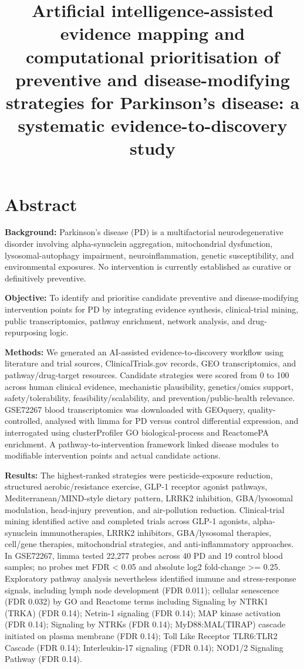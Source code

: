 \documentclass{article}
\begin{document}
\title{Artificial intelligence-assisted evidence mapping and computational prioritisation of preventive and disease-modifying strategies for Parkinson's disease: a systematic evidence-to-discovery study}
\maketitle

\section{Abstract}

\textbf{Background:} Parkinson's disease (PD) is a multifactorial neurodegenerative disorder involving alpha-synuclein aggregation, mitochondrial dysfunction, lysosomal-autophagy impairment, neuroinflammation, genetic susceptibility, and environmental exposures. No intervention is currently established as curative or definitively preventive.


\textbf{Objective:} To identify and prioritise candidate preventive and disease-modifying intervention points for PD by integrating evidence synthesis, clinical-trial mining, public transcriptomics, pathway enrichment, network analysis, and drug-repurposing logic.


\textbf{Methods:} We generated an AI-assisted evidence-to-discovery workflow using literature and trial sources, ClinicalTrials.gov records, GEO transcriptomics, and pathway/drug-target resources. Candidate strategies were scored from 0 to 100 across human clinical evidence, mechanistic plausibility, genetics/omics support, safety/tolerability, feasibility/scalability, and prevention/public-health relevance. GSE72267 blood transcriptomics was downloaded with GEOquery, quality-controlled, analysed with limma for PD versus control differential expression, and interrogated using clusterProfiler GO biological-process and ReactomePA enrichment. A pathway-to-intervention framework linked disease modules to modifiable intervention points and actual candidate actions.


\textbf{Results:} The highest-ranked strategies were pesticide-exposure reduction, structured aerobic/resistance exercise, GLP-1 receptor agonist pathways, Mediterranean/MIND-style dietary pattern, LRRK2 inhibition, GBA/lysosomal modulation, head-injury prevention, and air-pollution reduction. Clinical-trial mining identified active and completed trials across GLP-1 agonists, alpha-synuclein immunotherapies, LRRK2 inhibitors, GBA/lysosomal therapies, cell/gene therapies, mitochondrial strategies, and anti-inflammatory approaches. In GSE72267, limma tested 22,277 probes across 40 PD and 19 control blood samples; no probes met FDR < 0.05 and absolute log2 fold-change >= 0.25. Exploratory pathway analysis nevertheless identified immune and stress-response signals, including lymph node development (FDR 0.011); cellular senescence (FDR 0.032) by GO and Reactome terms including Signaling by NTRK1 (TRKA) (FDR 0.14); Netrin-1 signaling (FDR 0.14); MAP kinase activation (FDR 0.14); Signaling by NTRKs (FDR 0.14); MyD88:MAL(TIRAP) cascade initiated on plasma membrane (FDR 0.14); Toll Like Receptor TLR6:TLR2 Cascade (FDR 0.14); Interleukin-17 signaling (FDR 0.14); NOD1/2 Signaling Pathway (FDR 0.14).
\end{document}

